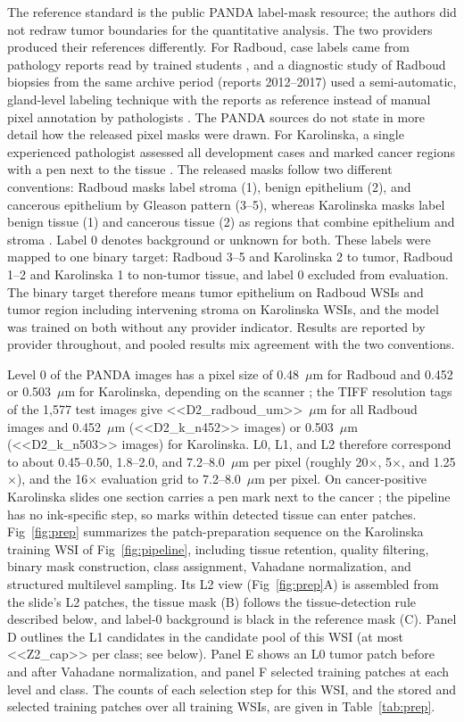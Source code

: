 \documentclass[10pt,letterpaper]{article}
\begin{document}
The reference standard is the public PANDA label-mask resource; the authors did not redraw tumor boundaries for the quantitative analysis. The two providers produced their references differently. For Radboud, case labels came from pathology reports read by trained students \cite{bibPANDAdesign}, and a diagnostic study of Radboud biopsies from the same archive period (reports 2012--2017) used a semi-automatic, gland-level labeling technique with the reports as reference instead of manual pixel annotation by pathologists \cite{bib10,bibBulten2019}. The PANDA sources do not state in more detail how the released pixel masks were drawn. For Karolinska, a single experienced pathologist assessed all development cases and marked cancer regions with a pen next to the tissue \cite{bibPANDAdesign}. The released masks follow two different conventions: Radboud masks label stroma (1), benign epithelium (2), and cancerous epithelium by Gleason pattern (3--5), whereas Karolinska masks label benign tissue (1) and cancerous tissue (2) as regions that combine epithelium and stroma \cite{bib11}. Label 0 denotes background or unknown for both. These labels were mapped to one binary target: Radboud 3--5 and Karolinska 2 to tumor, Radboud 1--2 and Karolinska 1 to non-tumor tissue, and label 0 excluded from evaluation. The binary target therefore means tumor epithelium on Radboud WSIs and tumor region including intervening stroma on Karolinska WSIs, and the model was trained on both without any provider indicator. Results are reported by provider throughout, and pooled results mix agreement with the two conventions.

Level 0 of the PANDA images has a pixel size of 0.48~$\mu$m for Radboud and 0.452 or 0.503~$\mu$m for Karolinska, depending on the scanner \cite{bibPANDAdesign}; the TIFF resolution tags of the 1,577 test images give <<D2_radboud_um>>~$\mu$m for all Radboud images and 0.452~$\mu$m (<<D2_k_n452>> images) or 0.503~$\mu$m (<<D2_k_n503>> images) for Karolinska. L0, L1, and L2 therefore correspond to about 0.45--0.50, 1.8--2.0, and 7.2--8.0~$\mu$m per pixel (roughly 20$\times$, 5$\times$, and 1.25$\times$), and the 16$\times$ evaluation grid to 7.2--8.0~$\mu$m per pixel. On cancer-positive Karolinska slides one section carries a pen mark next to the cancer \cite{bibPANDAdesign}; the pipeline has no ink-specific step, so marks within detected tissue can enter patches. Fig~\ref{fig:prep} summarizes the patch-preparation sequence on the Karolinska training WSI of Fig~\ref{fig:pipeline}, including tissue retention, quality filtering, binary mask construction, class assignment, Vahadane normalization, and structured multilevel sampling. Its L2 view (Fig~\ref{fig:prep}A) is assembled from the slide's L2 patches, the tissue mask (B) follows the tissue-detection rule described below, and label-0 background is black in the reference mask (C). Panel D outlines the L1 candidates in the candidate pool of this WSI (at most <<Z2_cap>> per class; see below). Panel E shows an L0 tumor patch before and after Vahadane normalization, and panel F selected training patches at each level and class. The counts of each selection step for this WSI, and the stored and selected training patches over all training WSIs, are given in Table~\ref{tab:prep}.
\end{document}

